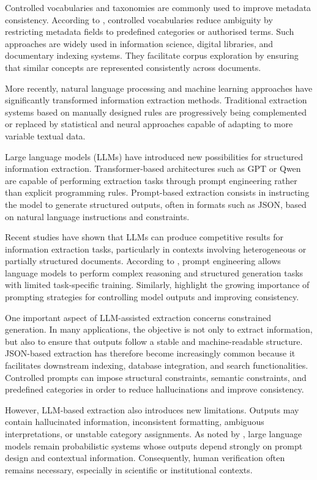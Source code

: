 \documentclass[
11pt,
english,
singlespacing,
headsepline,
]{MastersDoctoralThesis}
\begin{document}
Controlled vocabularies and taxonomies are commonly used to improve metadata consistency. According to \citet{hedden2016taxonomy}, controlled vocabularies reduce ambiguity by restricting metadata fields to predefined categories or authorised terms. Such approaches are widely used in information science, digital libraries, and documentary indexing systems. They facilitate corpus exploration by ensuring that similar concepts are represented consistently across documents.

More recently, natural language processing and machine learning approaches have significantly transformed information extraction methods. Traditional extraction systems based on manually designed rules are progressively being complemented or replaced by statistical and neural approaches capable of adapting to more variable textual data.

Large language models (LLMs) have introduced new possibilities for structured information extraction. Transformer-based architectures such as GPT \citep{brown2020language} or Qwen are capable of performing extraction tasks through prompt engineering rather than explicit programming rules. Prompt-based extraction consists in instructing the model to generate structured outputs, often in formats such as JSON, based on natural language instructions and constraints.

Recent studies have shown that LLMs can produce competitive results for information extraction tasks, particularly in contexts involving heterogeneous or partially structured documents. According to \citet{wei2022chain}, prompt engineering allows language models to perform complex reasoning and structured generation tasks with limited task-specific training. Similarly, \citet{liu2023pre} highlight the growing importance of prompting strategies for controlling model outputs and improving consistency.

One important aspect of LLM-assisted extraction concerns constrained generation. In many applications, the objective is not only to extract information, but also to ensure that outputs follow a stable and machine-readable structure. JSON-based extraction has therefore become increasingly common because it facilitates downstream indexing, database integration, and search functionalities. Controlled prompts can impose structural constraints, semantic constraints, and predefined categories in order to reduce hallucinations and improve consistency.

However, LLM-based extraction also introduces new limitations. Outputs may contain hallucinated information, inconsistent formatting, ambiguous interpretations, or unstable category assignments. As noted by \citet{bommasani2021opportunities}, large language models remain probabilistic systems whose outputs depend strongly on prompt design and contextual information. Consequently, human verification often remains necessary, especially in scientific or institutional contexts.
\end{document}
